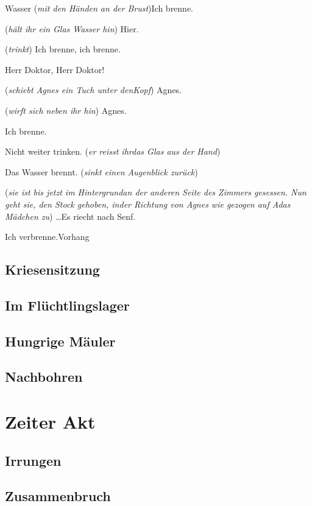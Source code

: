 \documentclass[
	final,
	a4paper,
	ngerman,
	mpinclude = true, %
	twoside = true,
	open = right,
	cleardoublepage = plain,
	DIV = 13,
	BCOR = 1cm,
	titlepage = firstiscover,
	]{scrbook}
\newcommand{\act}{\chapter}
\newcommand{\scene}{\setcounter{subscene}{1}\section}
\newcommand{\direction}[1]{(\textit{#1})}
\newcounter{subscene}
\newcommand{\thecharacter}[1]{\textup{\textsc{#1}}\xspace}
\newcommand{\theBarbara}{\thecharacter{Barbara}}
\newcommand{\theJosef}{\thecharacter{Josef}}
\newcommand{\theKathrine}{\thecharacter{Kathrine}}
\newcommand{\theAndreas}{\thecharacter{Andreas}}
\newcommand{\theLuise}{\thecharacter{Luise}}
\newcommand{\theAgnes}{\thecharacter{Agnes}}
\newcommand{\theThomsen}{\thecharacter{Doktor Thomsen}}
\newcommand{\character}[1]{\item[#1]}
\newcommand{\Barbara}{\character{\theBarbara}}
\newcommand{\Josef}{\character{\theJosef}}
\newcommand{\Kathrine}{\character{\theKathrine}}
\newcommand{\Andreas}{\character{\theAndreas}}
\newcommand{\Luise}{\character{\theLuise}}
\newcommand{\Agnes}{\character{\theAgnes}}
\newcommand{\Thomsen}{\character{\theThomsen}}
\begin{document}
\begin{play}
\Agnes
Wasser \direction{mit den Händen an der Brust}Ich brenne.

\Luise
\direction{hält ihr ein Glas Wasser hin} Hier.

\Agnes
\direction{trinkt} Ich brenne, ich brenne.

\Josef
Herr Doktor, Herr Doktor!

\Barbara
\direction{schiebt Agnes ein Tuch unter denKopf} Agnes.

\Andreas
\direction{wirft sich neben ihr hin} Agnes.

\Agnes
Ich brenne.

\Thomsen
Nicht weiter trinken. \direction{er reisst ihrdas Glas aus der Hand}

\Agnes
Das Wasser brennt. \direction{sinkt einen Augenblick zurück}

\Kathrine
\direction{sie ist bis jetzt im Hintergrundan der anderen Seite des Zimmers gesessen. Nun geht sie, den Stock gehoben, inder Richtung von Agnes wie gezogen auf Adas Mädchen zu} \ldots Es riecht nach Senf.

\Agnes
Ich verbrenne.Vorhang

\end{play}

\scene{Kriesensitzung}
\scene{Im Flüchtlingslager}
\scene{Hungrige Mäuler}
\scene{Nachbohren}

\act{Zeiter Akt}
\scene{Irrungen}
\scene{Zusammenbruch}
\end{document}
